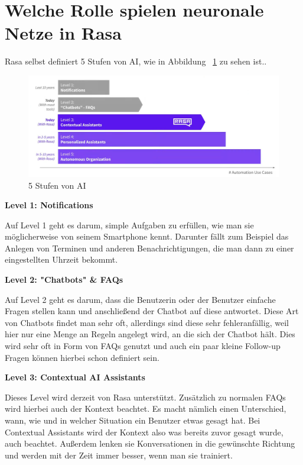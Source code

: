 \section{Welche Rolle spielen neuronale Netze in Rasa}\label{sec:neural-networks}

Rasa selbst definiert 5 Stufen von AI, wie in Abbildung ~\ref{fig:5_levels_of_ai} zu sehen ist.\@.\cite{ai5Levels}

\begin{figure}[hbt!]
    \centering
    \includegraphics[scale=0.25]{pics/5_levels_of_ai}
    \caption{5 Stufen von AI~\cite{ai5LevelsVideo}}
    \label{fig:5_levels_of_ai}
\end{figure}

\textbf{Level 1: Notifications}

Auf Level 1 geht es darum, simple Aufgaben zu erfüllen, wie man sie möglicherweise von seinem Smartphone kennt.
Darunter fällt zum Beispiel das Anlegen von Terminen und anderen Benachrichtigungen, die man dann zu einer eingestellten Uhrzeit bekommt.\cite{rasaMasterclass5Levels,ai5Levels,ai5LevelsVideo}

\textbf{Level 2: "Chatbots" \& FAQs}

Auf Level 2 geht es darum, dass die Benutzerin oder der Benutzer einfache Fragen stellen kann und anschließend der Chatbot auf diese antwortet.
Diese Art von Chatbots findet man sehr oft, allerdings sind diese sehr fehleranfällig, weil hier nur eine Menge an Regeln angelegt wird, an die sich der Chatbot hält.
Dies wird sehr oft in Form von FAQs genutzt und auch ein paar kleine Follow-up Fragen können hierbei schon definiert sein.\cite{rasaMasterclass5Levels,ai5Levels,ai5LevelsVideo}

\textbf{Level 3: Contextual AI Assistants}

Dieses Level wird derzeit von Rasa unterstützt.
Zusätzlich zu normalen FAQs wird hierbei auch der Kontext beachtet.
Es macht nämlich einen Unterschied, wann, wie und in welcher Situation ein Benutzer etwas gesagt hat.
Bei Contextual Assistants wird der Kontext also was bereits zuvor gesagt wurde, auch beachtet.
Außerdem lenken sie Konversationen in die gewünschte Richtung und werden mit der Zeit immer besser, wenn man sie trainiert.\cite{rasaMasterclass5Levels,ai5Levels,ai5LevelsVideo}

